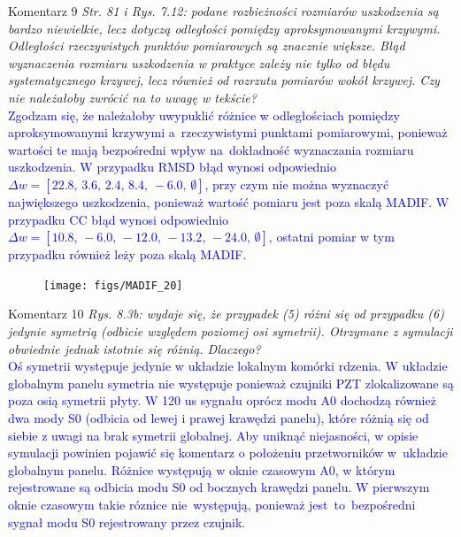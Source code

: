 \documentclass[10pt,aspectratio=169]{beamer} %
\begin{document}
\begin{frame}[label=frame15]{Komentarz 9}\justifying
\textit{Str. 81 i Rys. 7.12: podane rozbieżności rozmiarów uszkodzenia są bardzo niewielkie, lecz dotyczą odległości pomiędzy aproksymowanymi krzywymi. Odległości rzeczywistych punktów
pomiarowych są znacznie większe. Błąd wyznaczenia rozmiaru uszkodzenia w praktyce zależy nie tylko od błędu systematycznego krzywej, lecz również od rozrzutu pomiarów wokół krzywej. Czy nie należałoby zwrócić na to uwagę w tekście?}\\
\textcolor{blue}{Zgodzam się, że należałoby uwypuklić różnice w odległościach pomiędzy aproksymowanymi krzywymi a~rzeczywistymi punktami pomiarowymi, ponieważ wartości te mają bezpośredni wpływ na~dokładność wyznaczania rozmiaru uszkodzenia.
W przypadku RMSD błąd wynosi odpowiednio \(\Delta w=[22.8,\,3.6,\,2.4,\,8.4,\,-6.0,\,\emptyset]\), przy czym nie można wyznaczyć największego uszkodzenia, ponieważ wartość pomiaru jest poza skalą MADIF. W przypadku CC błąd wynosi odpowiednio \(\Delta w=[10.8,\,-6.0,\,-12.0,\,-13.2,\,-24.0,\,\emptyset]\), ostatni pomiar w tym przypadku również leży poza skalą MADIF.}
\end{frame}
\begin{frame}
		\begin{figure}
			\centering
			\texttt{[image: figs/MADIF\_20]}
		\end{figure}
\end{frame}
\begin{frame}[label=frame16]{Komentarz 10}\justifying
\textit{Rys. 8.3b: wydaje się, że przypadek (5) różni się od przypadku (6) jedynie symetrią (odbicie względem poziomej osi symetrii). Otrzymane z symulacji obwiednie jednak istotnie się różnią.	Dlaczego?}\\
\textcolor{blue}{Oś symetrii występuje jedynie w układzie lokalnym komórki rdzenia. W układzie globalnym panelu symetria nie występuje ponieważ czujniki PZT zlokalizowane są poza osią symetrii płyty. W 120 us sygnału oprócz modu A0 dochodzą również dwa mody S0 (odbicia od lewej i prawej krawędzi panelu), które różnią się od siebie z uwagi na brak symetrii globalnej. Aby uniknąć niejasności, w opisie symulacji powinien pojawić się komentarz o położeniu przetworników w~układzie globalnym panelu. Różnice występują w oknie czasowym A0, w którym rejestrowane są odbicia modu S0 od bocznych krawędzi panelu. W pierwszym oknie czasowym takie róznice nie~wy\-stępują, ponieważ jest~to~bezpośredni sygnał modu S0 rejestrowany przez czujnik.}
\end{frame}
\end{document}

